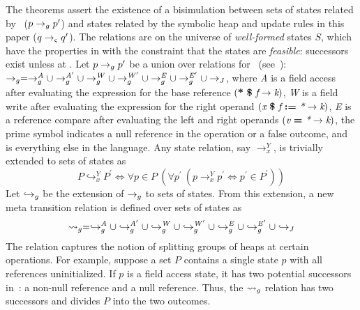 The theorems assert the existence of a
bisimulation between sets of states related by~\gsetxt{} ($p \rightarrow_{g}
p^\prime$) and states related by the symbolic heap and update rules in this paper ($q \rightarrow_{\varsigma}
q^\prime$). The relations are on the universe of \emph{well-formed}
states $S$, which have the properties in  with the
constraint that the states are \emph{feasible}: successors exist
unless at . Let $p \rightarrow_{g} p^\prime$ be a union over relations
for~\gsetxt{} (see~\cite{Hillery:2015}): $\rightarrow_{g} = \rightarrow_{g}^\mathit{A} \cup
\rightarrow_{g}^\mathit{A^\prime} \cup \rightarrow_{g}^\mathit{W} \cup
\rightarrow_{g}^\mathit{W^\prime} \cup \rightarrow_{g}^\mathit{E} \cup
\rightarrow_{g}^\mathit{E^\prime} \cup \rightarrow_{J}$, where \emph{A} is a field access
after evaluating the expression for the base reference $(
\textbf{*}\ \textbf{\$}\ \emph{f} \rightarrow \emph{k})$, \emph{W} is
a field write after evaluating the expression for the right operand
$\lp \cfgnt{x}\ \cfgt{\$}\ \cfgnt{f}\ \cfgt{:=}\ \cfgnt{*} \rightarrow
\cfgnt{k}\rp$, \emph{E} is a reference compare after evaluating the
left and right operands $\lp \cfgnt{v}\ \cfgt{=}\ \cfgnt{*}
\rightarrow \cfgnt{k}\rp$, the prime symbol indicates a null reference
in the operation or a false outcome, and \emph{\com} is everything
else in the language. Any state relation, say $\rightarrow_x^Y$, is
trivially extended to sets of states as
$$
P \hookrightarrow_x^Y P^\prime \Longleftrightarrow \forall p \in P\ (\forall p^\prime\ (p \rightarrow_x^Y p^\prime \Leftrightarrow p^\prime \in P^\prime))
$$
Let $\hookrightarrow_{g}$ be the extension of $\rightarrow_{g}$ to sets of
states. From this extension, a new meta transition relation is defined
over sets of states as
$$
\leadsto_{g} = \hookrightarrow_{g}^\mathit{A}
\cup \hookrightarrow_{g}^\mathit{A^\prime} \cup \hookrightarrow_{g}^\mathit{W} \cup
\hookrightarrow_{g}^\mathit{W^\prime} \cup \hookrightarrow_{g}^\mathit{E} \cup \hookrightarrow_{g}^\mathit{E^\prime}
\cup \hookrightarrow_{J}
$$
The relation captures the notion of splitting groups of heaps at
certain operations. For example, suppose a set $P$ contains a single state $p$
with all references uninitialized. If $p$ is a field access state, it has two
potential successors in~\gsetxt{}: a non-null reference and a null reference. 
Thus, the $\leadsto_{g}$ relation has two successors and divides $P$ into the two outcomes.

